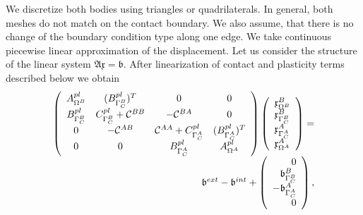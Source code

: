 \documentclass[12pt,a4paper]{scrbook}
\begin{document}
We discretize both bodies using triangles or quadrilaterals. In general, both meshes do not match on the contact boundary. We also assume, that there is no change of the boundary condition type along one edge. We take continuous piecewise linear approximation of the displacement. Let us consider the structure of the linear system $\mathfrak  A \mathfrak x = {\mathfrak b} $. After linearization of contact and plasticity terms described below we obtain
\begin{equation*}
 \begin{array}{r}
   \left (
   \begin{array}{cccc}
   A^{pl}_{\Omega^{B}}    & (B^{pl}_{\Gamma^{B}_C})^{T}                 & 0                & 0\\
   B^{pl}_{\Gamma^{B}_C} & C^{pl}_{\Gamma^{B}_C} + \mathcal{C}^{BB}   & -\mathcal{C}^{B A}& 0 \\
   0               & -\mathcal{C}^{A B} & \mathcal{C}^{A A}+C^{pl}_{\Gamma^{A}_C}   & (B^{pl}_{\Gamma^{A}_C})^T \\
   0               & 0                 & B^{pl}_{\Gamma^{A}_C} & A^{pl}_{\Omega^{A}}
   \end{array}
   \right )
 \left (
  \begin{array}{l}
      \mathfrak x^{B}_{\Omega^{B}} \\
      \mathfrak x^{B}_{\Gamma_C^{B}} \\
      \mathfrak x^{A}_{\Gamma_C^{A}} \\
      \mathfrak x^{A}_{\Omega^{A}} 
  \end{array}
 \right )
= \\
 {\mathfrak b}^{ext} - {\mathfrak b}^{int} +
 \left (
  \begin{array}{r}
      0 \\
      {\mathfrak b}^{B}_{\Gamma_C^{B}} \\
      -{\mathfrak b}^{A}_{\Gamma_C^{A}} \\
      0 
  \end{array}
 \right ),
 \end{array}
\end{equation*}
\end{document}

